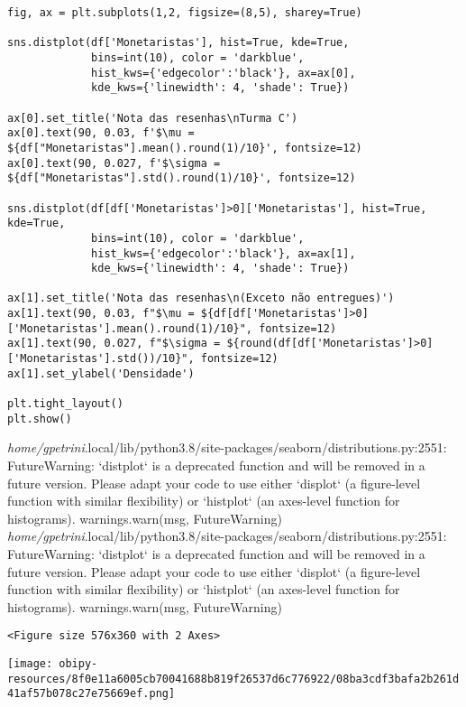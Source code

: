 \documentclass[11pt]{article}
\begin{document}
\begin{verbatim}
fig, ax = plt.subplots(1,2, figsize=(8,5), sharey=True)

sns.distplot(df['Monetaristas'], hist=True, kde=True, 
             bins=int(10), color = 'darkblue', 
             hist_kws={'edgecolor':'black'}, ax=ax[0],
             kde_kws={'linewidth': 4, 'shade': True})

ax[0].set_title('Nota das resenhas\nTurma C')
ax[0].text(90, 0.03, f'$\mu = ${df["Monetaristas"].mean().round(1)/10}', fontsize=12)
ax[0].text(90, 0.027, f'$\sigma = ${df["Monetaristas"].std().round(1)/10}', fontsize=12)

sns.distplot(df[df['Monetaristas']>0]['Monetaristas'], hist=True, kde=True, 
             bins=int(10), color = 'darkblue', 
             hist_kws={'edgecolor':'black'}, ax=ax[1],
             kde_kws={'linewidth': 4, 'shade': True})

ax[1].set_title('Nota das resenhas\n(Exceto não entregues)')
ax[1].text(90, 0.03, f"$\mu = ${df[df['Monetaristas']>0]['Monetaristas'].mean().round(1)/10}", fontsize=12)
ax[1].text(90, 0.027, f"$\sigma = ${round(df[df['Monetaristas']>0]['Monetaristas'].std())/10}", fontsize=12)
ax[1].set_ylabel('Densidade')

plt.tight_layout()
plt.show()
\end{verbatim}

\emph{home/gpetrini}.local/lib/python3.8/site-packages/seaborn/distributions.py:2551: FutureWarning: `distplot` is a deprecated function and will be removed in a future version. Please adapt your code to use either `displot` (a figure-level function with similar flexibility) or `histplot` (an axes-level function for histograms).
  warnings.warn(msg, FutureWarning)
\emph{home/gpetrini}.local/lib/python3.8/site-packages/seaborn/distributions.py:2551: FutureWarning: `distplot` is a deprecated function and will be removed in a future version. Please adapt your code to use either `displot` (a figure-level function with similar flexibility) or `histplot` (an axes-level function for histograms).
  warnings.warn(msg, FutureWarning)

\begin{verbatim}
<Figure size 576x360 with 2 Axes>
\end{verbatim}


\begin{center}
\texttt{[image: obipy-resources/8f0e11a6005cb70041688b819f26537d6c776922/08ba3cdf3bafa2b261d41af57b078c27e75669ef.png]}
\end{center}
\end{document}
